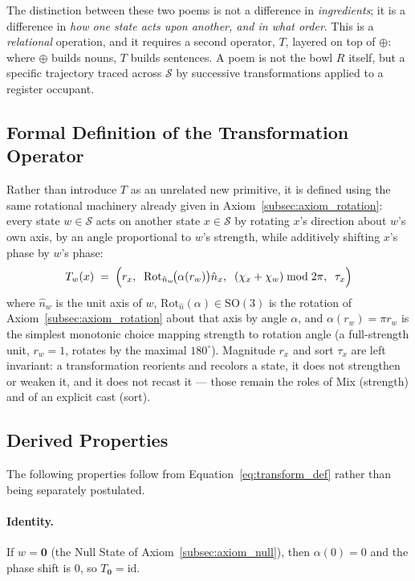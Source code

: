 \documentclass[12pt, a4paper]{article}
\begin{document}
The distinction between these two poems is not a difference in
\emph{ingredients}; it is a difference in \emph{how one state acts
upon another, and in what order}. This is a \emph{relational}
operation, and it requires a second operator, $T$, layered on top of
$\oplus$: where $\oplus$ builds nouns, $T$ builds sentences. A poem is
not the bowl $R$ itself, but a specific trajectory traced across
$\mathcal{S}$ by successive transformations applied to a register occupant.

\subsection{Formal Definition of the Transformation Operator}
\label{subsec:transform_definition}
Rather than introduce $T$ as an unrelated new primitive, it is defined
using the same rotational machinery already given in
Axiom~\ref{subsec:axiom_rotation}: every state $w \in \mathcal{S}$
acts on another state $x \in \mathcal{S}$ by rotating $x$'s direction
about $w$'s own axis, by an angle proportional to $w$'s strength, while
additively shifting $x$'s phase by $w$'s phase:
\begin{equation}
    T_w(x)
    \;=\;
    \Bigl(
        r_x,\;\;
        \mathrm{Rot}_{\hat n_w}\!\bigl(\alpha(r_w)\bigr)\hat n_x,\;\;
        (\chi_x + \chi_w) \bmod 2\pi,\;\;
        \tau_x
    \Bigr)
    \label{eq:transform_def}
\end{equation}
where $\hat n_w$ is the unit axis of $w$,
$\mathrm{Rot}_{\hat n}(\alpha) \in \mathrm{SO}(3)$ is the
rotation of Axiom~\ref{subsec:axiom_rotation} about that axis by angle
$\alpha$, and $\alpha(r_w) = \pi r_w$ is the simplest monotonic choice
mapping strength to rotation angle (a full-strength unit, $r_w = 1$,
rotates by the maximal $180^\circ$). Magnitude $r_x$ and sort $\tau_x$ are left invariant:
a transformation reorients and recolors a state, it does not
strengthen or weaken it, and it does not recast it --- those remain
the roles of Mix (strength) and of an explicit cast (sort).

\subsection{Derived Properties}
\label{subsec:transform_properties}
The following properties follow from Equation~\eqref{eq:transform_def}
rather than being separately postulated.

\paragraph{Identity.} If $w = \mathbf{0}$ (the Null State of
Axiom~\ref{subsec:axiom_null}), then $\alpha(0) = 0$ and the phase
shift is $0$, so $T_{\mathbf{0}} = \mathrm{id}$.
\end{document}
